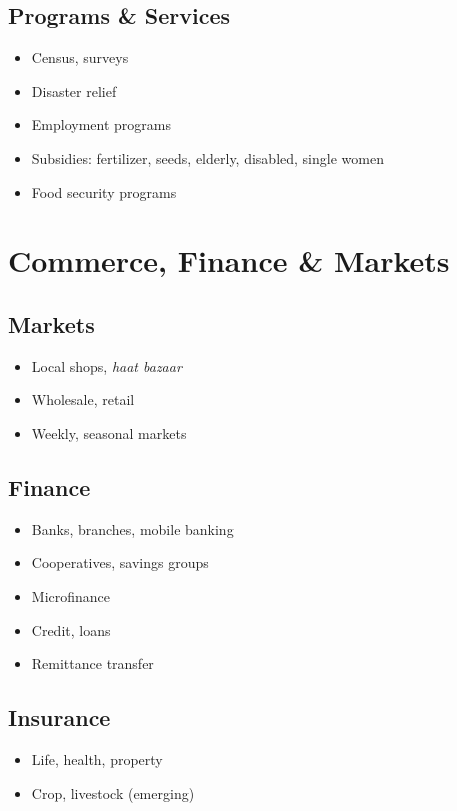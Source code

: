 \documentclass[11pt,a4paper]{article}
\begin{document}
\subsection{Programs \& Services}
\begin{itemize}
    \item Census, surveys
    \item Disaster relief
    \item Employment programs
    \item Subsidies: fertilizer, seeds, elderly, disabled, single women
    \item Food security programs
\end{itemize}

\section{Commerce, Finance \& Markets}

\subsection{Markets}
\begin{itemize}
    \item Local shops, \textit{haat bazaar}
    \item Wholesale, retail
    \item Weekly, seasonal markets
\end{itemize}

\subsection{Finance}
\begin{itemize}
    \item Banks, branches, mobile banking
    \item Cooperatives, savings groups
    \item Microfinance
    \item Credit, loans
    \item Remittance transfer
\end{itemize}

\subsection{Insurance}
\begin{itemize}
    \item Life, health, property
    \item Crop, livestock (emerging)
\end{itemize}
\end{document}
